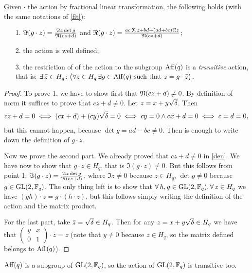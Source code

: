 \begin{prop}
Given $\cdot$ the action by fractional linear transformation, the following holds (with the same notations of \ref{flt}):
\begin{itemize}
\item[1.] $\Im (g\cdot z) = \frac{\Im z \det g}{\operatorname{\mathfrak{N}} (cz+d)}$ and
$\Re (g\cdot z) = \frac{ac\operatorname{\mathfrak{N}} z +bd+(ad+bc)\Re z}{\operatorname{\mathfrak{N}} (cz+d)}$;
\item[2.] the action is well defined;
\item[3.] the restriction of of the action to the subgroup $\operatorname{Aff} (q)$ is a {\it transitive} action, that is:
	$\exists \, \bar{z} \in H_q \colon \big( \forall z \in H_q\, \exists g \in \operatorname{Aff} (q)\,\,\text{such that}\,\, z=g \cdot \bar{z} \big) $. 
\end{itemize}
\begin{proof}
To prove 1. we have to show first that $\operatorname{\mathfrak{N}} (cz+d)\neq 0$. 
By definition of norm it suffices to prove that $cz+d \neq 0$.  Let $z=x+y\sqrt{\delta}$. Then
\begin{equation}\label{den}
	cz+d=0 \iff (cx+d)+(cy)\sqrt{\delta}=0 \iff cy=0 \land cx+d=0 \iff c=d=0,
\end{equation}
but this cannot happen, because $\det g = ad-bc \neq 0$. Then is enough to write down the definition of $g\cdot z$.

Now we prove the second part. We already proved that $cz+d\neq 0$ in \ref{den}.
We have now to show that $g\cdot z \in H_q$, that is $\Im (g\cdot z)\neq 0$. But this follows from point 1:
$\Im (g\cdot z) = \frac{\Im z \det g}{\operatorname{\mathfrak{N}} (cz+d)}$, where $\Im z \neq 0$ because $z \in H_q$,
$\det g \neq 0$ because $g \in \operatorname{GL}(2,{\mathbb F}_q)$. The only thing left is to show that
$\forall \, h,g \in \operatorname{GL}(2,{\mathbb F}_q), \forall\, z \in H_q$ we have $(gh)\cdot z=g \cdot (h\cdot z)$, but this follows simply 
writing the definition of the action and the matrix product.

For the last part, take $\bar{z} = \sqrt{\delta} \in H_q$. Then for any $z=x+y\sqrt{\delta} \in H_q$ we have that $\begin{pmatrix} y & x \\ 0 & 1 \end{pmatrix} \cdot \bar{z} = z$ (note that $y\neq 0$ because $z \in H_q$, so the matrix defined belongs to $\operatorname{Aff} (q)$).
\end{proof}
\end{prop}
\begin{rem}
$\operatorname{Aff} (q)$ is a subgroup of $\operatorname{GL}(2,{\mathbb F}_q)$, so the action of $\operatorname{GL}(2,{\mathbb F}_q)$ is transitive too.
\end{rem}

